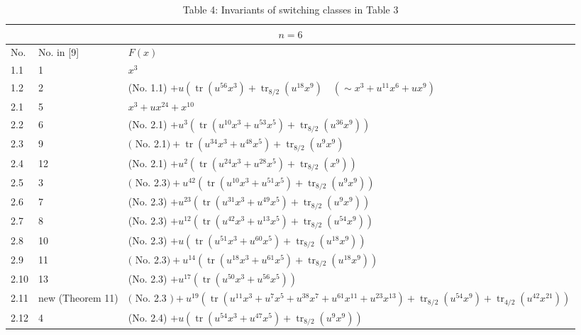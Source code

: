 \documentclass[10pt]{article}
\begin{document}
\begin{table}[h]
\begin{center}
\captionsetup{labelformat=empty}
\caption{Table 4: Invariants of switching classes in Table 3}
\begin{tabular}{|l|l|l|}
\hline
\multicolumn{3}{|c|}{$n=6$} \\
\hline
No. & No. in [9] & $F(x)$ \\
\hline
1.1 & 1 & $x^{3}$ \\
\hline
1.2 & 2 & (No. 1.1) $+u\left(\operatorname{tr}\left(u^{56} x^{3}\right)+\operatorname{tr}_{8 / 2}\left(u^{18} x^{9}\right) \quad\left(\sim x^{3}+u^{11} x^{6}+u x^{9}\right)\right.$ \\
\hline
2.1 & 5 & $x^{3}+u x^{24}+x^{10}$ \\
\hline
2.2 & 6 & (No. 2.1) $+u^{3}\left(\operatorname{tr}\left(u^{10} x^{3}+u^{53} x^{5}\right)+\operatorname{tr}_{8 / 2}\left(u^{36} x^{9}\right)\right)$ \\
\hline
2.3 & 9 & $($ No. 2.1$)+\operatorname{tr}\left(u^{34} x^{3}+u^{48} x^{5}\right)+\operatorname{tr}_{8 / 2}\left(u^{9} x^{9}\right)$ \\
\hline
2.4 & 12 & (No. 2.1) $+u^{2}\left(\operatorname{tr}\left(u^{24} x^{3}+u^{28} x^{5}\right)+\operatorname{tr}_{8 / 2}\left(x^{9}\right)\right)$ \\
\hline
2.5 & 3 & $($ No. 2.3$)+u^{42}\left(\operatorname{tr}\left(u^{10} x^{3}+u^{51} x^{5}\right)+\operatorname{tr}_{8 / 2}\left(u^{9} x^{9}\right)\right)$ \\
\hline
2.6 & 7 & (No. 2.3) $+u^{23}\left(\operatorname{tr}\left(u^{31} x^{3}+u^{49} x^{5}\right)+\operatorname{tr}_{8 / 2}\left(u^{9} x^{9}\right)\right)$ \\
\hline
2.7 & 8 & (No. 2.3) $+u^{12}\left(\operatorname{tr}\left(u^{42} x^{3}+u^{13} x^{5}\right)+\operatorname{tr}_{8 / 2}\left(u^{54} x^{9}\right)\right)$ \\
\hline
2.8 & 10 & (No. 2.3) $+u\left(\operatorname{tr}\left(u^{51} x^{3}+u^{60} x^{5}\right)+\operatorname{tr}_{8 / 2}\left(u^{18} x^{9}\right)\right)$ \\
\hline
2.9 & 11 & $($ No. 2.3$)+u^{14}\left(\operatorname{tr}\left(u^{18} x^{3}+u^{61} x^{5}\right)+\operatorname{tr}_{8 / 2}\left(u^{18} x^{9}\right)\right)$ \\
\hline
2.10 & 13 & (No. 2.3) $+u^{17}\left(\operatorname{tr}\left(u^{50} x^{3}+u^{56} x^{5}\right)\right)$ \\
\hline
2.11 & new (Theorem 11) & $($ No. 2.3 $)+u^{19}\left(\operatorname{tr}\left(u^{11} x^{3}+u^{7} x^{5}+u^{38} x^{7}+u^{61} x^{11}+u^{23} x^{13}\right)+\right. \left.\operatorname{tr}_{8 / 2}\left(u^{54} x^{9}\right)+\operatorname{tr}_{4 / 2}\left(u^{42} x^{21}\right)\right)$ \\
\hline
2.12 & 4 & (No. 2.4) $+u\left(\operatorname{tr}\left(u^{54} x^{3}+u^{47} x^{5}\right)+\operatorname{tr}_{8 / 2}\left(u^{9} x^{9}\right)\right)$ \\
\hline
\end{tabular}
\end{center}
\end{table}
\end{document}
